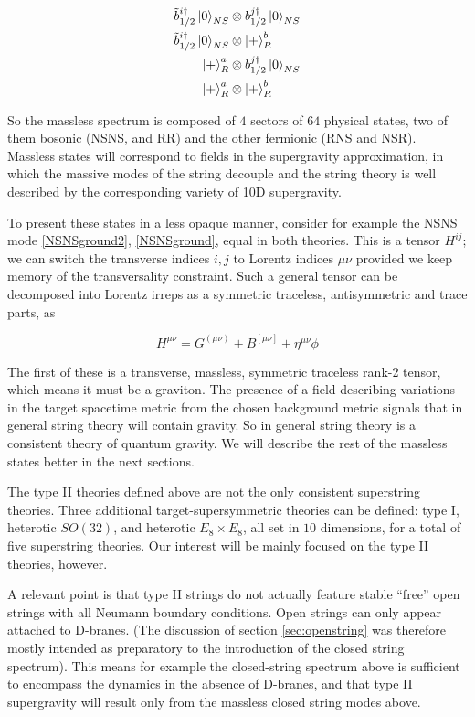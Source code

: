 \begin{align}
	\tilde b_{1/2}^{i\dagger} \ket 0_{NS} &\otimes b_{1/2}^{j\dagger}\ket{0}_{NS} \label{NSNSground}\\
	\tilde b_{1/2}^{i\dagger} \ket 0_{NS} &\otimes \ket{+}^b_{R}\\
	\ket{+}^a_R &\otimes b_{1/2}^{j\dagger}\ket{0}_{NS}\\
	\ket{+}^a_R &\otimes \ket{+}^b_R
	\label{fourgrounds}
\end{align}

So the massless spectrum is composed of $4$ sectors of $64$ physical states, two of them bosonic (NSNS, and RR) and the other fermionic (RNS and NSR). Massless states will correspond to fields in the supergravity approximation, in which the massive modes of the string decouple and the string theory is well described by the corresponding variety of 10D supergravity.

To present these states in a less opaque manner, consider for example the NSNS mode \eqref{NSNSground2}, \eqref{NSNSground}, equal in both theories. This is a tensor $H^{ij}$; we can switch the transverse indices $i,j$ to Lorentz indices $\mu\nu$ provided we keep memory of the transversality constraint. Such a general tensor can be decomposed into Lorentz irreps as a symmetric traceless, antisymmetric and trace parts, as

\begin{equation}
	H^{\mu\nu} = G^{(\mu\nu)} + B^{[\mu\nu]} + \eta^{\mu\nu} \phi
	\label{}
\end{equation}

The first of these is a transverse, massless, symmetric traceless rank-2 tensor, which means it must be a graviton. The presence of a field describing variations in the target spacetime metric from the chosen background metric signals that in general string theory will contain gravity. So in general string theory is a consistent theory of quantum gravity. We will describe the rest of the massless states better in the next sections.

The type II theories defined above are not the only consistent superstring theories. Three additional target-supersymmetric theories can be defined: type I, heterotic $SO(32)$, and heterotic $E_8\times E_8$, all set in $10$ dimensions, for a total of five superstring theories. Our interest will be mainly focused on the type II theories, however.

A relevant point is that type II strings do not actually feature stable ``free'' open strings with all Neumann boundary conditions. Open strings can only appear attached to D-branes. (The discussion of section \ref{sec:openstring} was therefore mostly intended as preparatory to the introduction of the closed string spectrum). This means for example the closed-string spectrum above is sufficient to encompass the dynamics in the absence of D-branes, and that type II supergravity will result only from the massless closed string modes above.

